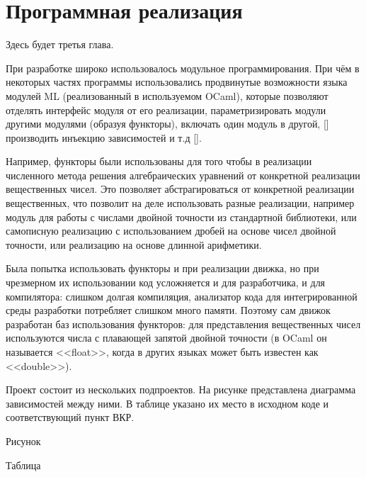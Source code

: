 \chapter{Программная реализация}

Здесь будет третья глава. \TODO

При разработке широко использовалось модульное программирования. При чём в некоторых частях программы использовались
продвинутые возможности языка модулей ML (реализованный в используемом OCaml), которые позволяют
отделять интерфейс модуля от его реализации,
параметризировать модули другими модулями (образуя функторы),
включать один модуль в другой, [\TODO]
производить инъекцию зависимостей и т.д [\TODO].

Например, функторы были использованы для того чтобы в реализации численного метода решения алгебраических уравнений
от конкретной реализации вещественных чисел. Это позволяет абстрагироваться от конкретной реализации вещественных,
что позволит на деле использовать разные реализации, например модуль для работы с числами двойной точности из стандартной библиотеки,
или самописную реализацию с использованием дробей на основе чисел двойной точности, или реализацию на основе длинной арифметики. \TODO

Была попытка использовать функторы и при реализации движка, но при чрезмерном их использовании код усложняется и для разработчика,
и для компилятора: слишком долгая компиляция, анализатор кода для интегрированной среды разработки потребляет слишком много памяти.
Поэтому сам движок разработан баз использования функторов: для представления вещественных чисел используются числа
с плавающей запятой двойной точности (в OCaml он называется <<float>>, когда в других языках может быть известен как <<double>>).


Проект состоит из нескольких подпроектов. На рисунке \TODO представлена диаграмма зависимостей между ними.
В таблице \TODO указано их место в исходном коде и соответствующий пункт ВКР.

\TODO Рисунок

\TODO Таблица


